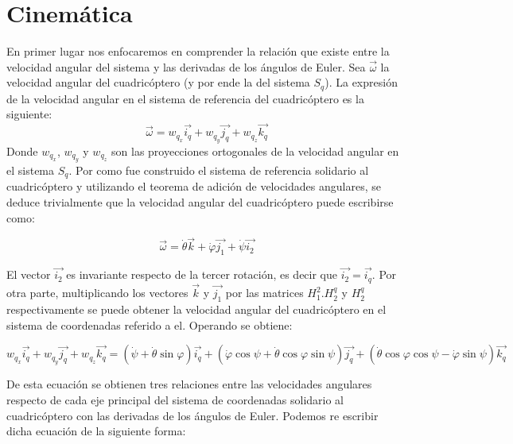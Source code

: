 \documentclass[main]{subfiles}
\begin{document}
\section{Cinem\'atica}
En primer lugar nos enfocaremos en comprender la relaci\'on que existe entre la velocidad angular del sistema y las derivadas de los \'angulos de Euler. Sea $\vec{\omega}$ la velocidad angular del cuadric\'optero (y por ende la del sistema $S_q$). La expresi\'on de la velocidad angular en el sistema de referencia del cuadric\'optero es la siguiente:
\begin{equation}
\vec{\omega}=w_{q_x}\vec{i_q}+w_{q_y}\vec{j_q}+w_{q_z}\vec{k_q}
\end{equation}
Donde $w_{q_x}$, $w_{q_y}$ y $w_{q_z}$ son las proyecciones ortogonales de la velocidad angular en el sistema $S_q$.
Por como fue construido el sistema de referencia solidario al cuadric\'optero y utilizando el teorema de adici\'on de velocidades angulares, se deduce trivialmente que la velocidad angular del cuadric\'optero puede escribirse como:

\begin{equation}
\vec{\omega}=\dot{\theta}\vec{k}+\dot{\varphi}\vec{j_1}+\dot{\psi}\vec{i_2}
\end{equation}

El vector $\vec{i_2}$ es invariante respecto de la tercer rotaci\'on, es decir que $\vec{i_2}=\vec{i_q}$. Por otra parte, multiplicando los vectores $\vec{k}$ y $\vec{j_1}$ por las matrices $H_1^2.H_2^q$ y $H_2^q$ respectivamente se puede obtener la velocidad angular del cuadric\'optero en el sistema de coordenadas referido a el. Operando se obtiene:

\begin{footnotesize}

\begin{equation}
w_{q_x}\vec{i_q}+w_{q_y}\vec{j_q}+w_{q_z}\vec{k_q}= (\dot{\psi}  +    \dot{\theta}\sin\varphi)\vec{i_q}+(\dot{\varphi}\cos\psi + \dot{\theta}\cos\varphi \sin\psi)\vec{j_q}+(\dot{\theta}\cos\varphi \cos\psi -  \dot{\varphi}\sin\psi)\vec{k_q}
\end{equation}
\end{footnotesize}

De esta ecuaci\'on se obtienen tres relaciones entre las velocidades angulares respecto de cada eje principal del sistema de coordenadas solidario al  cuadric\'optero con las derivadas de los \'angulos de Euler. Podemos re escribir dicha ecuaci\'on de la siguiente forma:
\end{document}
